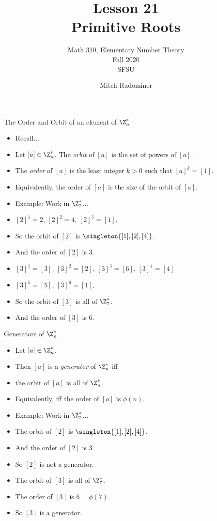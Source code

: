 \documentclass[handout]{beamer}
\title{Lesson 21 \\ Primitive Roots}
\subtitle{Math 310, Elementary Number Theory \\ Fall 2020 \\ SFSU}
\author{Mitch Rudominer}
\date{}
\begin{document}
\begin{frame}
  \titlepage
\end{frame}

\begin{frame}{The Order and Orbit of an element of $\Z_n^*$}

\begin{itemize}
  \item Recall...
  \item Let $[a]\in\Z^*_n$. The \emph{orbit} of $[a]$ is
  the set of powers of $[a]$.
  \item The \emph{order} of $[a]$ is
  the least integer $k>0$ such that $[a]^k=[1]$.
  \item Equivalently, the order of $[a]$ is the size of the orbit of $[a]$.
  \item Example: Work in $\Z^*_7$...
  \item $[2]^1 = 2$, $[2]^2 = 4$, $[2]^3=[1]$.
  \item So the orbit of $[2]$ is $\singleton{[1],[2],[4]}$.
  \item And the order of $[2]$ is $3$.
  \item $[3]^1=[3]$, $[3]^2=[2]$, $[3]^3=[6]$, $[3]^4=[4]$
  \item $[3]^5=[5]$, $[3]^6=[1]$.
  \item So the orbit of $[3]$ is all of $\Z^*_7$.
  \item And the order of $[3]$ is $6$.
\end{itemize}

\end{frame}

\begin{frame}{Generators of $\Z_n^*$}

\begin{itemize}
  \item Let $[a]\in\Z^*_n$.
  \item Then $[a]$ is a \emph{generator} of $\Z_n^*$ iff
  \item the orbit of $[a]$ is all of $\Z_n^*$.
  \item Equivalently, iff the order of $[a]$ is $\phi(n)$.
  \item Example: Work in $\Z^*_7$...
  \item The orbit of $[2]$ is $\singleton{[1],[2],[4]}$.
  \item And the order of $[2]$ is $3$.
  \item So $[2]$ is not a generator.
  \item The orbit of $[3]$ is all of $\Z^*_7$.
  \item The order of $[3]$ is $6 = \phi(7)$.
  \item So $[3]$ is a generator.
\end{itemize}

\end{frame}
\end{document}
